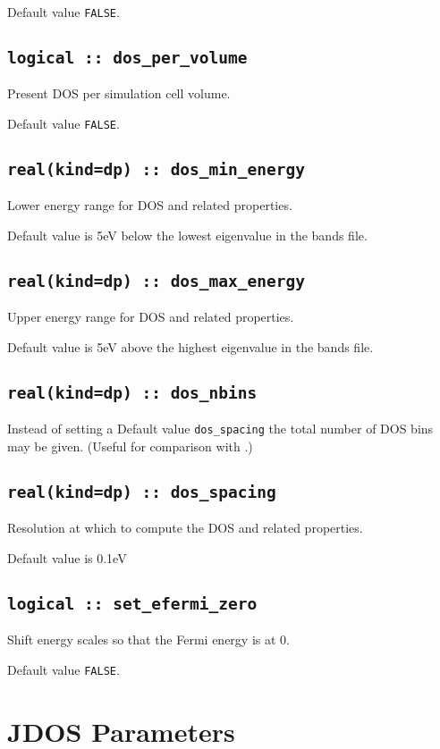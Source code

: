 \documentclass[a4paper,11pt,twoside]{book}
\begin{document}
{Default value \verb#FALSE#.

\subsection[DOS\_per\_volume]{\tt logical :: dos\_per\_volume}
Present DOS per simulation cell volume.

Default value \verb#FALSE#.

\subsection[dos\_min\_energy]{\tt real(kind=dp) :: dos\_min\_energy}
Lower energy range for DOS and related properties.

Default value is 5eV below the lowest eigenvalue in the bands file.

\subsection[dos\_max\_energy]{\tt real(kind=dp) :: dos\_max\_energy}
Upper energy range for DOS and related properties.

Default value is 5eV above the highest eigenvalue in the bands file.


\subsection[dos\_nbins]{\tt real(kind=dp) :: dos\_nbins}
Instead of setting a Default value \verb#dos_spacing# the total number of DOS bins may be given.  (Useful for comparison with \lindos.)

\subsection[dos\_spacing]{\tt real(kind=dp) :: dos\_spacing}
Resolution at which to compute the DOS and related properties.

Default value is 0.1eV

\subsection[set\_efermi\_zero]{\tt logical :: set\_efermi\_zero}
Shift energy scales so that the Fermi energy is at 0.

Default value \verb#FALSE#.



\section{JDOS Parameters}

}
\end{document}
